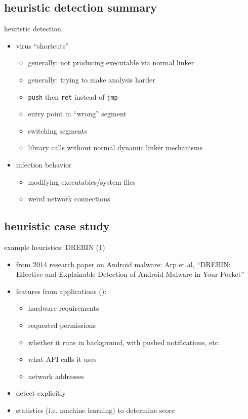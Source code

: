 \subsection{heuristic detection summary}

\begin{frame}{heuristic detection}
    \begin{itemize}
    \item virus ``shortcuts''
        \begin{itemize}
        \item generally: not producing executable via normal linker
        \item generally: trying to make analysis harder
        \item {\tt push} then {\tt ret} instead of {\tt jmp}
        \item entry point in ``wrong'' segment
        \item switching segments
        \item library calls without normal dynamic linker mechanisms
        \end{itemize}
    \item infection behavior
        \begin{itemize}
        \item modifying executables/system files
        \item weird network connections
        \end{itemize}
    \end{itemize}
\end{frame}

\subsection{heuristic case study}

\begin{frame}{example heuristics: DREBIN (1)}
    \begin{itemize}
    \item {\small from 2014 research paper on Android malware: Arp et al, ``DREBIN: Effective and Explainable Detection of Android Malware in Your Pocket''}
    \item features from applications ():
        \begin{itemize}
        \item hardware requirements
        \item requested permissions
        \item whether it runs in background, with pushed notifications, etc.
        \item what API calls it uses
        \item network addresses
        \end{itemize}
    \item detect  explicitly
    \item statistics (i.e. machine learning) to determine score
    \end{itemize}
\end{frame}


